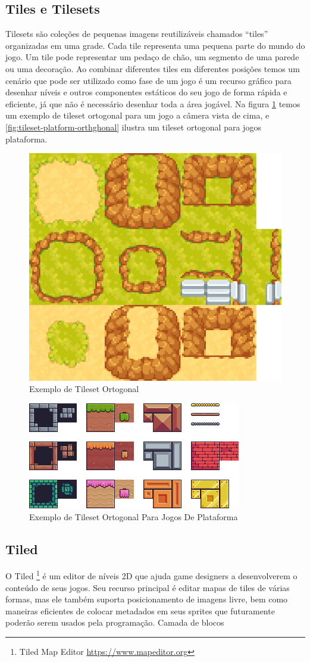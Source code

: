 \subsection{Tiles e Tilesets}
Tilesets são coleções de pequenas imagens reutilizáveis chamados “tiles” organizadas em uma grade. Cada tile representa uma pequena parte do mundo do jogo. Um tile pode representar um pedaço de chão, um segmento de uma parede ou uma decoração. Ao combinar diferentes tiles em diferentes posições temos um cenário que pode ser utilizado como fase de um jogo é um recurso gráfico para desenhar níveis e outros componentes estáticos do seu jogo de forma rápida e eficiente, já que não é necessário desenhar toda a área jogável.
Na figura \ref{fig:tileset-orthogonal} temos um exemplo de tileset ortogonal para um jogo a câmera vista de cima, e \ref{fig:tileset-platform-orthghonal} ilustra um tileset ortogonal para jogos plataforma.
\begin{figure}[h!]
    \centering
    \includegraphics[width=0.5\linewidth]{figuras/tileset.png}
    \caption{Exemplo de Tileset Ortogonal}
    \label{fig:tileset-orthogonal}
\end{figure}
\begin{figure}[h!]
    \centering
    \includegraphics[width=0.5\linewidth]{figuras/tileset-orthogonal-platform.png}
    \caption{Exemplo de Tileset Ortogonal Para Jogos De Plataforma}
    \label{fig:tileset-platform-orthogonal}
\end{figure}

\subsection{Tiled}
O Tiled \footnote{Tiled Map Editor \url{https://www.mapeditor.org}} é um editor de níveis 2D que ajuda game designers a desenvolverem o conteúdo de seus jogos. Seu recurso principal é editar mapas de tiles de várias formas, mas ele também suporta posicionamento de imagens livre, bem como maneiras eficientes de colocar metadados em seus sprites que futuramente poderão serem usados pela programação.
Camada de blocos

